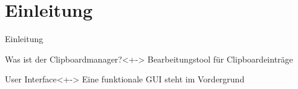 \section{Einleitung}
\begin{frame}{Einleitung}
	\begin{block}{Was ist der Clipboardmanager?}<+->
		Bearbeitungstool für Clipboardeinträge
	\end{block}
	\begin{block}{User Interface}<+->
		Eine funktionale GUI steht im Vordergrund
	\end{block}
\end{frame}
